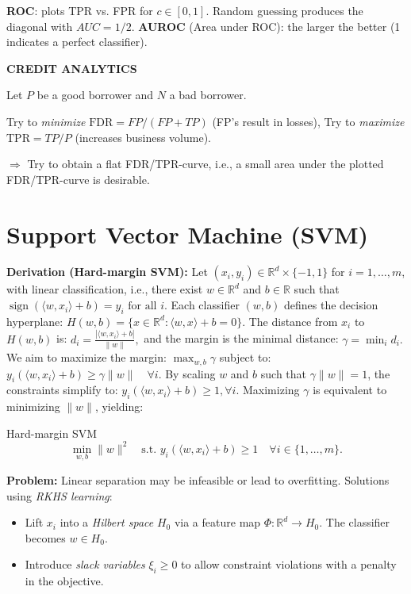 \documentclass[a4paper,10pt]{article}
\newenvironment{myitemize}
{\vspace{-0.25cm}\begin{itemize}}
{\end{itemize}}
\newcommand{\subtitle}[1]{\vspace{0.25cm}\begin{normalsize}\textbf{\textcolor{gray!150}{\uppercase{#1}}}\end{normalsize}}
\begin{document}
\begin{small}
\textbf{ROC}: plots TPR vs. FPR for $c \in [0, 1]$. Random guessing produces the diagonal with $AUC = 1/2$.
\textbf{AUROC} (Area under ROC): the larger the better (1 indicates a perfect classifier).

\subtitle{Credit Analytics}

Let $P$ be a good borrower and $N$ a bad borrower.

Try to \textit{minimize} $\text{FDR} = FP/(FP + TP)$ (FP’s result in losses), Try to \textit{maximize} $\text{TPR} = TP/P$ (increases business volume). 

$\Rightarrow$ Try to obtain a flat FDR/TPR-curve, i.e., a small area under the plotted FDR/TPR-curve is desirable.


\section{Support Vector Machine (SVM)}

\textbf{Derivation (Hard-margin SVM):} 
Let $ (x_i, y_i) \in \mathbb{R}^d \times \{-1, 1\} $ for $ i = 1, \dots, m $, with linear classification, i.e., there exist $ w \in \mathbb{R}^d $ and $ b \in \mathbb{R} $ such that
$
\operatorname{sign}(\langle w, x_i \rangle + b) = y_i \text{ for all } i.
$
Each classifier $ (w, b) $ defines the decision hyperplane:
$
H(w, b) = \{ x \in \mathbb{R}^d : \langle w, x \rangle + b = 0 \}.
$
The distance from $ x_i $ to $ H(w, b) $ is:
$
d_i = \frac{|\langle w, x_i \rangle + b|}{\|w\|},
$
and the margin is the minimal distance:
$
\gamma = \min_{i} d_i.
$
We aim to maximize the margin:
$
\max_{w, b} \gamma
$
subject to:
$
y_i (\langle w, x_i \rangle + b) \geq \gamma \|w\| \quad \forall i.
$
By scaling $ w $ and $ b $ such that $ \gamma \|w\| = 1 $, the constraints simplify to:
$
y_i (\langle w, x_i \rangle + b) \geq 1,  \forall i.
$
Maximizing $ \gamma $ is equivalent to minimizing $ \|w\| $, yielding:

\begin{subbox}{Hard-margin SVM}
$$
\min_{w, b} \|w\|^2
\quad 
\text{s.t. }
y_i (\langle w, x_i \rangle + b) \geq 1 \quad  \forall i \in \{1, \dots, m\}.
$$
\end{subbox}

\textbf{Problem:} Linear separation may be infeasible or lead to overfitting. Solutions using \textit{RKHS learning}:

\begin{myitemize}
    \item Lift $x_i$ into a \textit{Hilbert space} $H_0$ via a feature map $\Phi : \mathbb{R}^d \to H_0$. The classifier becomes $w \in H_0$.
    \item Introduce \textit{slack variables} $\xi_i \geq 0$ to allow constraint violations with a penalty in the objective.
\end{myitemize}


\end{small}
\end{document}
